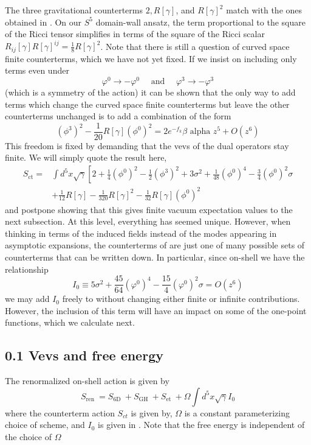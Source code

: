 \documentclass{article}
\begin{document}
The three gravitational counterterms \(2, R[\gamma]\), and \(R[\gamma]^{2}\) match with the ones obtained in . On our \(S^{5}\) domain-wall ansatz, the term proportional to the square of the Ricci tensor simplifies in terms of the square of the Ricci scalar \(R_{i j}[\gamma] R[\gamma]^{i j}=\frac{1}{8} R[\gamma]^{2}\). Note that there is still a question of curved space finite counterterms, which we have not yet fixed. If we insist on including only terms even under
\[
\varphi^{0} \rightarrow -\varphi^{0} \quad \text { and } \quad \varphi^{3} \rightarrow -\varphi^{3}
\]
(which is a symmetry of the action) it can be shown that the only way to add terms which change the curved space finite counterterms but leave the other counterterms unchanged is to add a combination of the form
\[
\left(\phi^{3}\right)^{2}-\frac{1}{20} R[\gamma]\left(\phi^{0}\right)^{2}=2 e^{-f_{k}} \beta \text { alpha } z^{5}+O\left(z^{6}\right)
\]
This freedom is fixed by demanding that the vevs of the dual operators stay finite. We will simply quote the result here,
\[
\begin{aligned}
S_{\mathrm{ct}}= & \int d^{5} x \sqrt{\gamma}\left[2+\frac{1}{4}\left(\phi^{0}\right)^{2}-\frac{1}{2}\left(\phi^{3}\right)^{2}+3 \sigma^{2}+\frac{1}{48}\left(\phi^{0}\right)^{4}-\frac{3}{4}\left(\phi^{0}\right)^{2} \sigma \\
& +\frac{1}{12} R[\gamma]-\frac{1}{320} R[\gamma]^{2}-\frac{1}{32} R[\gamma]\left(\phi^{0}\right)^{2}
\end{aligned}
\]
and postpone showing that this gives finite vacuum expectation values to the next subsection. At this level, everything has seemed unique. However, when thinking in terms of the induced fields instead of the modes appearing in asymptotic expansions, the counterterms of are just one of many possible sets of counterterms that can be written down. In particular, since on-shell we have the relationship
\[
I_{0} \equiv 5 \sigma^{2}+\frac{45}{64}\left(\varphi^{0}\right)^{4}-\frac{15}{4}\left(\varphi^{0}\right)^{2} \sigma=O\left(z^{6}\right)
\]
we may add \(I_{0}\) freely to without changing either finite or infinite contributions. However, the inclusion of this term will have an impact on some of the one-point functions, which we calculate next.
\subsection*{0.1 Vevs and free energy}
The renormalized on-shell action is given by
\[
S_{\text {ren }}=S_{\text {6D }}+S_{\text {GH }}+S_{\text {et }}+\Omega \int d^{5} x \sqrt{\gamma} I_{0}
\]
where the counterterm action \(S_{c t}\) is given by, \(\Omega\) is a constant parameterizing choice of scheme, and \(I_{0}\) is given in . Note that the free energy is independent of the choice of \(\Omega\)
\end{document}
